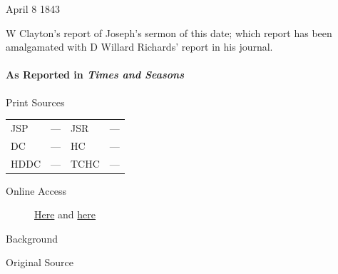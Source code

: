 					April 8 1843

					W Clayton's report of Joseph's sermon of this date; which report has been amalgamated with D Willard Richards' report in his journal.
					
			\paragraph{As Reported in \textit{Times and Seasons}}
				\label{EMS-1843-JS-6-8-APR-1843-TS}
			
				\begin{description}
					\item[Print Sources]
				\end{description}

					\begin{tabular}{p{0.5in}p{1in}p{0.5in}p{1in}}
					JSP	 	& ---		& JSR 		& --- \\
					DC	 	& ---		& HC 		& --- \\
					HDDC 	& ---		& TCHC 		& --- \\
					\end{tabular}
				
				\begin{description}
					\item[Online Access] \href{https://www.josephsmithpapers.org/paper-summary/discourse-6-april-1843-a-as-reported-by-times-and-seasons/1}{Here} and \href{https://www.josephsmithpapers.org/paper-summary/discourse-6-april-1843-b-as-reported-by-times-and-seasons/1}{here}
				\end{description}
				
				\begin{description}
					\item[Background]
				\end{description}
				
				
				\begin{description}
					\item[Original Source]
				\end{description}
				
